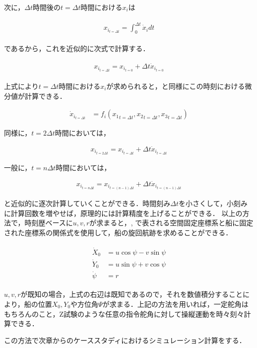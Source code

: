 次に，$\Delta t$時間後の$t=\Delta t$時間における$x_i$は

\begin{align}
    \begin{split}
        x_{i_{t=\Delta t}}=\int_{0}^{\Delta t} \dot{x}_{i} d t \label{eq:2-56}
    \end{split}
\end{align}

であるから，これを近似的に次式で計算する．

\begin{align}
    \begin{split}
        x_{i_{t=\Delta t}}=x_{i_{t=0}}+\Delta t \dot{x}_{i_{t=0}} \label{eq:2-57}
    \end{split}
\end{align}

上式により$t=\Delta t$時間における$x_i$が求められると，と同様にこの時刻における微分値が計算できる．

\begin{align}
    \dot{x}_{i_{t=\Delta t}} &= f_i({x_1}_{t=\Delta t}, {x_2}_{t=\Delta t}, {x_3}_{t=\Delta t}) \label{eq:2-58}
\end{align}

同様に，$t=2 \Delta t$時間においては，

\begin{align}
    x_{i_{t=2\Delta t}}=x_{i_{t=\Delta t}}+\Delta t \dot{x}_{i_{t=\Delta t}} \label{eq:2-59}
\end{align}

一般に，$t=n \Delta t$時間においては，

\begin{align}
     x_{i_{t=n\Delta t}}=x_{i_{t=(n-1) \Delta t}}+\Delta t \dot{x}_{i_{t=(n-1) \Delta t}} \label{eq:2-60}
\end{align}

と近似的に逐次計算していくことができる．時間刻み$\Delta t$を小さくして，小刻みに計算回数を増やせば，原理的には計算精度を上げることができる．
以上の方法で，時刻歴ベースに$u,v,r$が求まると，, で表される空間固定座標系と船に固定された座標系の関係式を使用して，船の旋回航跡を求めることができる．

\begin{align}
    \begin{split}
        \dot{X}_{0}&=u \cos \psi-v \sin \psi \\
        \dot{Y}_{0}&=u \sin \psi+v \cos \psi \\
        \dot{\psi}&=r \label{eq:2-61}
    \end{split}
\end{align}


$u,v,r$が既知の場合，上式の右辺は既知であるので，それを数値積分することにより，船の位置$X_0,Y_0$や方位角$\Psi$が求まる．上記の方法を用いれば，一定舵角はもちろんのこと，Z試験のような任意の指令舵角に対して操縦運動を時々刻々計算できる．

この方法で次章からのケーススタディにおけるシミュレーション計算をする．